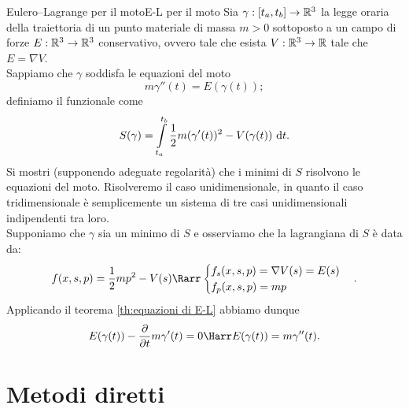 \documentclass[openany]{book}
\begin{document}
\begin{exercise}{Eulero--Lagrange per il moto}{E-L per il moto}
    Sia $\gamma : [t_a,t_b]\to \mathbb{R}^3$ la legge oraria della traiettoria di un punto materiale di massa $m>0$ sottoposto a un campo di forze $E : \mathbb{R}^3 \to \mathbb{R}^3$ conservativo, ovvero tale che esista $V : \mathbb{R}^3\to \mathbb{R}$ tale che $E = \nabla V$.\\ Sappiamo che $\gamma$ soddisfa le equazioni del moto
    \[ m \gamma''(t) = E(\gamma(t)); \]
    definiamo il funzionale  come
    \[S(\gamma) = \intop_{t_a}^{t_b} \frac{1}{2} m (\gamma'(t))^2 - V(\gamma(t)) \de t .\]
    Si mostri (supponendo adeguate regolarità) che i minimi di $S$ risolvono le equazioni del moto.
    \solution 
    Risolveremo il caso unidimensionale, in quanto il caso tridimensionale è semplicemente un sistema di tre casi unidimensionali indipendenti tra loro.\\
    Supponiamo che $\gamma$ sia un minimo di $S$ e osserviamo che la lagrangiana di $S$ è data da:
    \[ f(x,s,p) = \frac{1}{2}m p^2 - V(s) \Rarr\begin{cases} f_s(x,s,p) = \nabla V(s) = E(s) \\ f_p(x,s,p)= m p\end{cases}. \]
    Applicando il teorema \ref{th:equazioni di E-L} abbiamo dunque 
    \[ E(\gamma(t)) - \frac{\partial}{\partial t} m \gamma'(t) = 0 \Harr E(\gamma(t)) = m \gamma''(t). \]
    \solved
\end{exercise}

\chapter{Metodi diretti}
\end{document}
